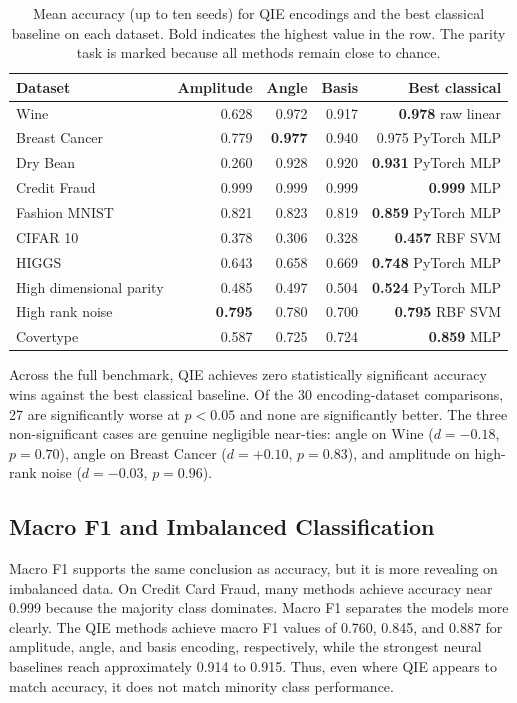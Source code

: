 \documentclass[12pt]{article}
\begin{document}
\begin{table}[tbp]
\centering
\caption{Mean accuracy (up to ten seeds) for QIE encodings and the best
classical baseline on each dataset. Bold indicates the highest value in the row.
The parity task is marked because all methods remain close to chance.}
\label{tab:accuracy}
\small
\begin{tabular}{lrrrr}
\toprule
Dataset & Amplitude & Angle & Basis & Best classical \\
\midrule
Wine                     & 0.628 & 0.972 & 0.917 & \textbf{0.978} raw linear \\
Breast Cancer            & 0.779 & \textbf{0.977} & 0.940 & 0.975 PyTorch MLP \\
Dry Bean                 & 0.260 & 0.928 & 0.920 & \textbf{0.931} PyTorch MLP \\
Credit Fraud             & 0.999 & 0.999 & 0.999 & \textbf{0.999} MLP \\
Fashion MNIST            & 0.821 & 0.823 & 0.819 & \textbf{0.859} PyTorch MLP \\
CIFAR 10                 & 0.378 & 0.306 & 0.328 & \textbf{0.457} RBF SVM \\
HIGGS                    & 0.643 & 0.658 & 0.669 & \textbf{0.748} PyTorch MLP \\
High dimensional parity   & 0.485 & 0.497 & 0.504 & \textbf{0.524} PyTorch MLP \\
High rank noise          & \textbf{0.795} & 0.780 & 0.700 & \textbf{0.795} RBF SVM \\
Covertype                & 0.587 & 0.725 & 0.724 & \textbf{0.859} MLP \\
\bottomrule
\end{tabular}
\end{table}

Across the full benchmark, QIE achieves zero statistically significant accuracy
wins against the best classical baseline. Of the 30 encoding-dataset comparisons, 27 are significantly worse at $p<0.05$
  and none are significantly better.
  The three non-significant cases are genuine negligible near-ties: angle on Wine
  ($d=-0.18$, $p=0.70$), angle on Breast Cancer ($d=+0.10$, $p=0.83$),
  and amplitude on high-rank noise ($d=-0.03$, $p=0.96$).
\subsection{Macro F1 and Imbalanced Classification}
\label{sec:f1}

Macro F1 supports the same conclusion as accuracy, but it is more revealing on
imbalanced data. On Credit Card Fraud, many methods achieve accuracy near 0.999
because the majority class dominates. Macro F1 separates the models more
clearly. The QIE methods achieve macro F1 values of 0.760, 0.845, and 0.887 for
amplitude, angle, and basis encoding, respectively, while the strongest neural
baselines reach approximately 0.914 to 0.915. Thus, even where QIE appears to
match accuracy, it does not match minority class performance.
\end{document}
